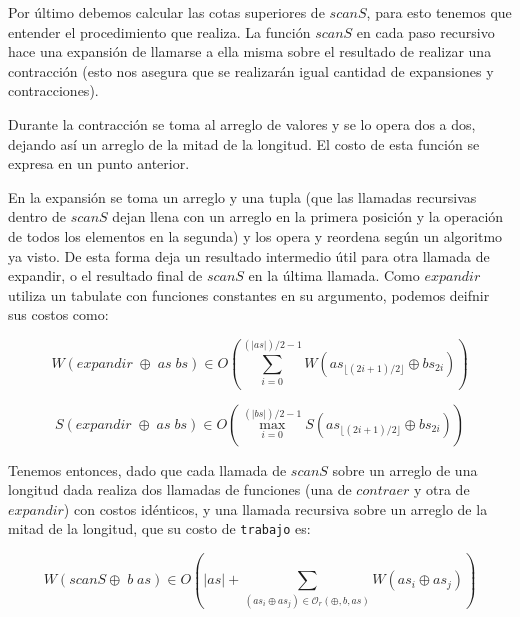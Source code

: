 \documentclass[a4paper,10pt]{article}
\begin{document}
    Por último debemos calcular las cotas superiores de $scanS$, para
esto tenemos que entender el procedimiento que realiza. La función $scanS$ en
cada paso recursivo hace una expansión de llamarse a ella misma 
sobre el resultado de realizar una contracción (esto nos asegura que se 
realizarán igual cantidad de expansiones y contracciones).


\bigskip

    Durante la contracción se toma al arreglo de valores y se lo opera
dos a dos, dejando así un arreglo de la mitad de la longitud. El costo
de esta función se expresa en un punto anterior.

\bigskip

    En la expansión se toma un arreglo y una tupla (que las llamadas recursivas 
dentro de $scanS$ dejan llena con un arreglo en la primera posición y la 
operación de todos los elementos en la segunda) y los opera y reordena según un
algoritmo ya visto.  De esta forma deja un resultado intermedio útil para otra
llamada de expandir, o el resultado final de $scanS$ en la última llamada. Como
$expandir$ utiliza un tabulate con funciones constantes en su argumento, podemos
deifnir sus costos como:

\begin{equation*}
    W \left( expandir \;\oplus \;as \;bs \right) \in
    O \left( \sum_{i=0}^{(\vert as \vert)/2 - 1} W \left( as_{\lfloor (2i+1)/2 \rfloor} \oplus bs_{2i} \right) \right)
\end{equation*}

\begin{equation*}
    S \left( expandir \;\oplus \;as \;bs \right) \in
    O \left( \max_{i=0}^{(\vert bs \vert)/2 - 1} S \left( as_{\lfloor (2i+1)/2 \rfloor} \oplus bs_{2i} \right) \right)
\end{equation*}

\bigskip

    Tenemos entonces, dado que cada llamada de $scanS$ sobre un arreglo de una
longitud dada realiza dos llamadas de funciones (una de $contraer$ y otra de
$expandir$) con costos idénticos, y una llamada recursiva sobre un arreglo de
la mitad de la longitud, que su costo de \texttt{trabajo} es:

\begin{equation*}
    W \left( scanS \oplus \; b \; as \right) \in
    O \left( \vert as \vert + \sum_{(as_i \oplus as_j) \in \mathcal{O}_r(\oplus,b,as)} W \left( as_i \oplus as_j \right) \right)
\end{equation*}
\end{document}
